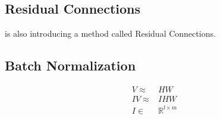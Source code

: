 \subsection{Residual Connections}
\cite{He:2015aa} is also introducing a method called Residual Connections.
\subsection{Batch Normalization}
\begin{equation}
\begin{split}
V \approx& HW \\
IV \approx& IHW\\
I \in& \mathbb{R}^{l \times m}
\end{split}
\end{equation}
















